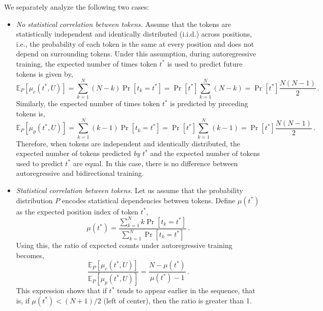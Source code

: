 \begin{remark}
\label{remark:ratio-autoregressive}
%
We separately analyze the following two cases:
%
\begin{itemize}[noitemsep,nolistsep]
%
    \item \emph{No statistical correlation between tokens.}
    Assume that the tokens are statistically independent and identically distributed (i.i.d.) across positions, i.e., the probability of each token is the same at every position and does not depend on surrounding tokens.
    Under this assumption, during autoregressive training, the expected number of times token \( t^* \) is used to predict future tokens is given by,
    \begin{equation}
    \mathbb{E}_P[\mu_c(t^*, U)] = \sum_{k=1}^N (N - k)\Pr[t_k = t^*] = \Pr[t^*] \sum_{k=1}^N (N - k) = \Pr[t^*] \frac{N(N-1)}{2} \,.
    \end{equation}
    Similarly, the expected number of times token \( t^* \) is predicted by preceding tokens is,
    \begin{equation}
    \mathbb{E}_P[\mu_p(t^*, U)] = \sum_{k=1}^N (k - 1)\Pr[t_k = t^*] = \Pr[t^*] \sum_{k=1}^N (k - 1) = \Pr[t^*] \frac{N(N-1)}{2} \,.
    \end{equation}
    Therefore, when tokens are independent and identically distributed, the expected number of tokens predicted \emph{by} \( t^* \) and the expected number of tokens used to predict \( t^* \) are equal. In this case, there is no difference between autoregressive and bidirectional training.
    \item \emph{Statistical correlation between tokens.} 
    Let us assume that the probability distribution \( P \) encodes statistical dependencies between tokens.
    Define \( \mu(t^*) \) as the expected position index of token \( t^* \),
    \begin{equation}
        \mu(t^*) = \frac{\sum_{k=1}^N k \Pr[t_k = t^*]}{\sum_{k=1}^N \Pr[t_k = t^*]} \,.
    \end{equation}
    Using this, the ratio of expected counts under autoregressive training becomes,
    \begin{equation}
    \frac{\mathbb{E}_P[\mu_c(t^*, U)]}{\mathbb{E}_P[\mu_p(t^*, U)]} = \frac{N - \mu(t^*)}{\mu(t^*) - 1} \,.
    \end{equation}
    This expression shows that if \( t^* \) tends to appear earlier in the sequence, that is, if \( \mu(t^*) < (N+1)/2 \) (left of center), then the ratio is greater than 1. 

\end{itemize}
\end{remark}
